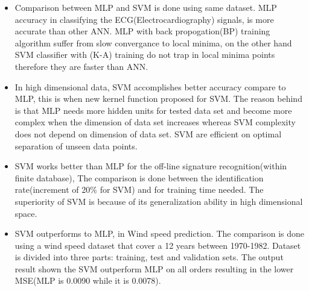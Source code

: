 
\begin{itemize}
	
	

	\item Comparison between MLP and SVM is done using same dataset. MLP accuracy in classifying the ECG(Electrocardiography) signals, is more accurate than other ANN. MLP with back propogation(BP) training algorithm suffer from slow convergance to local minima, on the other hand SVM classifier with (K-A) training do not trap in local minima points therefore they are faster than ANN. \cite{Moavenian20103088}
	\item  In high dimensional data, SVM accomplishes better accuracy compare to MLP, this is when new kernel function proposed for SVM. The reason behind is that MLP needs more hidden units for tested data set and become more complex when the dimension of data set increases whereas SVM complexity does not depend on dimension of data set. SVM are efficient on optimal separation of unseen data points.\cite{Zanaty2012177}
	\item SVM works better than MLP for the off-line signature recognition(within finite database), The comparison is done between the identification rate(increment of 20\% for SVM) and for training time needed. The superiority of SVM is because of its generalization ability in high dimensional space\cite{FriasMartinez2006693}.

	\item SVM outperforms to MLP, in Wind speed prediction. The comparison is done using a wind speed dataset that cover a 12 years between 1970-1982. Dataset is divided into three parts: training, test and validation sets. The output result shown the SVM outperform MLP on all orders resulting in the lower MSE(MLP is 0.0090 while it is 0.0078)\cite{Mohandes2004939}.

	
      

\end{itemize}



	